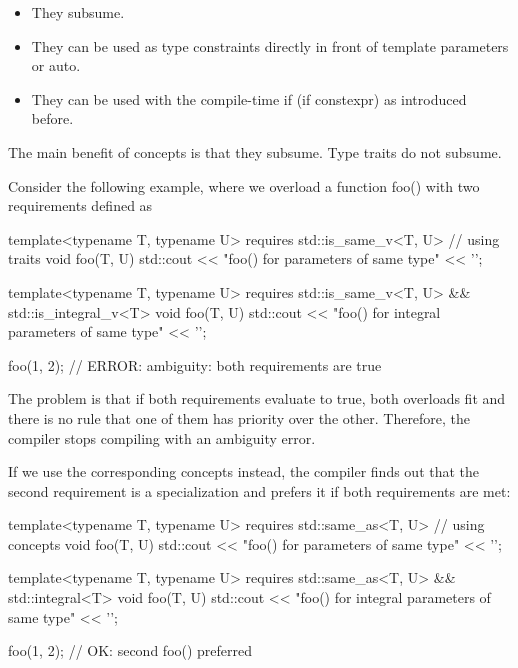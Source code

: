 \begin{itemize}
\item
They subsume.

\item
They can be used as type constraints directly in front of template parameters or auto.

\item
They can be used with the compile-time if (if constexpr) as introduced before.
\end{itemize}



The main benefit of concepts is that they subsume. Type traits do not subsume.

Consider the following example, where we overload a function foo() with two requirements defined as



\begin{cpp}
template<typename T, typename U>
requires std::is_same_v<T, U> // using traits
void foo(T, U)
{
	std::cout << "foo() for parameters of same type" << '\n';
}

template<typename T, typename U>
requires std::is_same_v<T, U> && std::is_integral_v<T>
void foo(T, U)
{
	std::cout << "foo() for integral parameters of same type" << '\n';
}

foo(1, 2); // ERROR: ambiguity: both requirements are true
\end{cpp}

The problem is that if both requirements evaluate to true, both overloads fit and there is no rule that one of them has priority over the other. Therefore, the compiler stops compiling with an ambiguity error.

If we use the corresponding concepts instead, the compiler finds out that the second requirement is a specialization and prefers it if both requirements are met:

\begin{cpp}
template<typename T, typename U>
requires std::same_as<T, U> // using concepts
void foo(T, U)
{
	std::cout << "foo() for parameters of same type" << '\n';
}

template<typename T, typename U>
requires std::same_as<T, U> && std::integral<T>
void foo(T, U)
{
	std::cout << "foo() for integral parameters of same type" << '\n';
}

foo(1, 2); // OK: second foo() preferred
\end{cpp}

